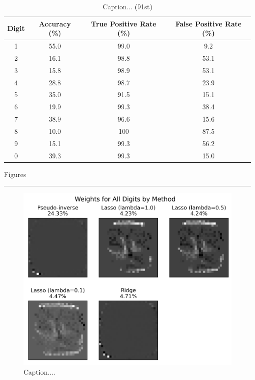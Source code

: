 \documentclass[10pt]{article}
\begin{document}
\begin{table}[ht]
\caption{Caption... (91st)}
\label{table2}
\begin{tabular}{|c|c|c|c|}
\hline
Digit & Accuracy (\%) & True Positive Rate (\%) & False Positive Rate (\%) \\ \hline
1     & 55.0          & 99.0                    & 9.2                      \\ \hline
2     & 16.1          & 98.8                    & 53.1                     \\ \hline
3     & 15.8          & 98.9                    & 53.1                     \\ \hline
4     & 28.8          & 98.7                    & 23.9                     \\ \hline
5     & 35.0          & 91.5                    & 15.1                     \\ \hline
6     & 19.9          & 99.3                    & 38.4                     \\ \hline
7     & 38.9          & 96.6                    & 15.6                     \\ \hline
8     & 10.0          & 100                     & 87.5                     \\ \hline
9     & 15.1          & 99.3                    & 56.2                     \\ \hline
0     & 39.3          & 99.3                    & 15.0                     \\ \hline
\end{tabular}
\end{table}


\newpage
\centerline{\Large{Figures}}
\vskip 10pt
\hrule

\begin{figure}[ht]
\centerline{\includegraphics[scale=0.75]{figures/weights_matrix_accuracy_all_digits_all_methods.png}}
\caption{Caption....}
\label{fig1}
\end{figure}
\end{document}
